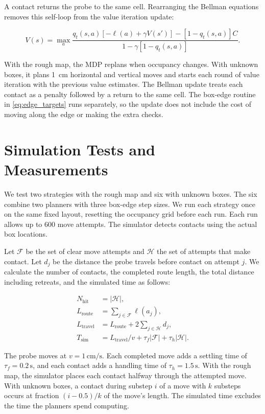 \documentclass[letterpaper,journal]{IEEEtran}
\begin{document}
A contact returns the probe to the same cell. Rearranging the Bellman equations removes this self-loop from the value iteration update:

\begin{equation}
 V(s)=\max_a\frac{
 q_t(s,a)[-\ell(a)+\gamma V(s')]
 -[1-q_t(s,a)]C}{1-\gamma[1-q_t(s,a)]}.
\end{equation}

With the rough map, the MDP replans when occupancy changes. With unknown boxes, it plans 1~cm horizontal and vertical moves and starts each round of value iteration with the previous value estimates. The Bellman update treats each contact as a penalty followed by a return to the same cell. The box-edge routine in \eqref{eq:edge_targets} runs separately, so the update does not include the cost of moving along the edge or making the extra checks.

\section{Simulation Tests and Measurements}

We test two strategies with the rough map and six with unknown boxes. The six combine two planners with three box-edge step sizes. We run each strategy once on the same fixed layout, resetting the occupancy grid before each run. Each run allows up to 600 move attempts. The simulator detects contacts using the actual box locations.

Let $\mathcal F$ be the set of clear move attempts and $\mathcal H$ the set of attempts that make contact. Let $d_j$ be the distance the probe travels before contact on attempt $j$. We calculate the number of contacts, the completed route length, the total distance including retreats, and the simulated time as follows:

\begin{align}
 N_{\mathrm{hit}}&=|\mathcal H|,\\
 L_{\mathrm{route}}&=\sum_{j\in\mathcal F}\ell(a_j),\\
 L_{\mathrm{travel}}&=L_{\mathrm{route}}+2\sum_{j\in\mathcal H}d_j,\\
 T_{\mathrm{sim}}&=L_{\mathrm{travel}}/v
                 +\tau_f|\mathcal F|+\tau_h|\mathcal H|.
\end{align}

The probe moves at $v=1\,\mathrm{cm/s}$. Each completed move adds a settling time of $\tau_f=0.2\,\mathrm{s}$, and each contact adds a handling time of $\tau_h=1.5\,\mathrm{s}$. With the rough map, the simulator places each contact halfway through the attempted move. With unknown boxes, a contact during substep $i$ of a move with $k$ substeps occurs at fraction $(i-0.5)/k$ of the move's length. The simulated time excludes the time the planners spend computing.
\end{document}
